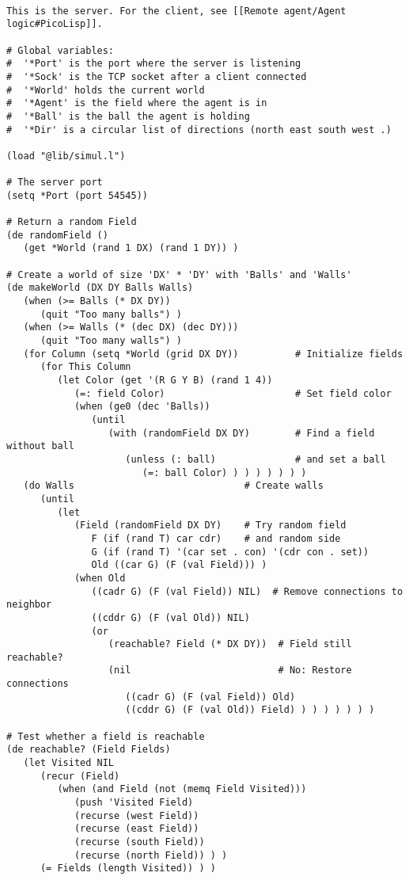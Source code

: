 \begin{verbatim}

This is the server. For the client, see [[Remote agent/Agent logic#PicoLisp]].

# Global variables:
#  '*Port' is the port where the server is listening
#  '*Sock' is the TCP socket after a client connected
#  '*World' holds the current world
#  '*Agent' is the field where the agent is in
#  '*Ball' is the ball the agent is holding
#  '*Dir' is a circular list of directions (north east south west .)

(load "@lib/simul.l")

# The server port
(setq *Port (port 54545))

# Return a random Field
(de randomField ()
   (get *World (rand 1 DX) (rand 1 DY)) )

# Create a world of size 'DX' * 'DY' with 'Balls' and 'Walls'
(de makeWorld (DX DY Balls Walls)
   (when (>= Balls (* DX DY))
      (quit "Too many balls") )
   (when (>= Walls (* (dec DX) (dec DY)))
      (quit "Too many walls") )
   (for Column (setq *World (grid DX DY))          # Initialize fields
      (for This Column
         (let Color (get '(R G Y B) (rand 1 4))
            (=: field Color)                       # Set field color
            (when (ge0 (dec 'Balls))
               (until
                  (with (randomField DX DY)        # Find a field without ball
                     (unless (: ball)              # and set a ball
                        (=: ball Color) ) ) ) ) ) ) )
   (do Walls                              # Create walls
      (until
         (let
            (Field (randomField DX DY)    # Try random field
               F (if (rand T) car cdr)    # and random side
               G (if (rand T) '(car set . con) '(cdr con . set))
               Old ((car G) (F (val Field))) )
            (when Old
               ((cadr G) (F (val Field)) NIL)  # Remove connections to neighbor
               ((cddr G) (F (val Old)) NIL)
               (or
                  (reachable? Field (* DX DY))  # Field still reachable?
                  (nil                          # No: Restore connections
                     ((cadr G) (F (val Field)) Old)
                     ((cddr G) (F (val Old)) Field) ) ) ) ) ) ) )

# Test whether a field is reachable
(de reachable? (Field Fields)
   (let Visited NIL
      (recur (Field)
         (when (and Field (not (memq Field Visited)))
            (push 'Visited Field)
            (recurse (west Field))
            (recurse (east Field))
            (recurse (south Field))
            (recurse (north Field)) ) )
      (= Fields (length Visited)) ) )


\end{verbatim}

